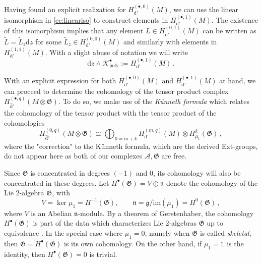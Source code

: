 \documentclass[11pt]{amsart}
\newcommand{\id}{\mathbb{1}}
\newcommand{\dr}{{\mathrm{d}}}
\newcommand{\CA}{{\mathcal A}}
\newcommand{\fG}{\mathfrak{G}}
\numberwithin{equation}{section}
\numberwithin{figure}{section}
\numberwithin{table}{section}
\theoremstyle{thm}
\numberwithin{equation}{subsection}
\theoremstyle{definition}
\theoremstyle{rem}
\begin{document}
Having found an explicit realization for \( H^{(\bullet,0)}_{\mathrm{d}'}(M) \), we can use the linear isomorphism in \eqref{ec:lineariso} to construct elements in \( H^{(\bullet,1)}_{\mathrm{d}'}(M) \). The existence of this isomorphism implies that any element \( \tilde{L} \in H^{(0,1)}_{\mathrm{d}'}(M) \) can be written as \( \tilde{L} = \tilde{L}_z \mathrm{d} z \) for some \( \tilde{L}_z \in H^{(0,0)}_{\mathrm{d}'}(M) \) and similarly with elements in $H^{(1,1)}_{\mathrm{d}'}(M)$. With a slight abuse of notation we will write
\begin{equation}
    \mathrm{d}z\wedge\mathcal{K}_{\mathrm{poly}}^\bullet  := H^{(\bullet,1)}_{\mathrm{d}'}(M) \,.
\end{equation}

With an explicit expression for both \( H^{(\bullet,0)}_{\mathrm{d}'}(M) \) and \( H^{(\bullet,1)}_{\mathrm{d}'}(M) \) at hand, we can proceed to determine the cohomology of the tensor product complex \( H_{\hat{\mathrm{d}}'}^{(\bullet,q)}(M \otimes \mathfrak{G}) \). To do so, we make use of the \emph{Künneth formula} which relates the cohomology of the tensor product with the tensor product of the cohomologies
\begin{equation}
    H_{\hat \dr'}^{(0,q)}(M\otimes \fG)\cong\bigoplus_{0=m+k}H^{(m,q)}_{\dr'}(M)\otimes H^k_{\mu_1}(\fG) \,,
\end{equation}
where the "correction" to the K{\"u}nneth formula, which are the derived Ext-groups, do not appear here as both of our complexes $\CA,\fG$ are free.

Since $\mathfrak{G}$ is concentrated in degrees $(-1)$ and $0$, its cohomology will also be concentrated in these degrees. Let $H^\bullet(\mathfrak{G}) = V \oplus \mathfrak{n}$
denote the cohomology of the Lie 2-algebra $\mathfrak{G}$, with
\begin{equation}
    V = \ker \mu_1 = H^{-1}(\mathfrak{G}), \qquad \mathfrak{n} = \mathfrak{g}/\mathrm{im}(\mu_1)= H^0(\mathfrak{G})\,,
\end{equation}
where $V$ is an Abelian $\mathfrak{n}$-module. By a theorem of Gerstenhaber, the cohomology $H^\bullet(\fG)$ is part of the data which characterizes Lie 2-algebras $\fG$ up to equivalence \cite{Wagemann+2021}. In the special case where $\mu_1=0$, namely when $\fG$ is called \textit{skeletal}, then $\fG = H^\bullet(\fG)$ is its own cohomology. On the other hand, if $\mu_1=\id$ is the identity, then $H^\bullet(\fG)=0$ is trivial. 
\end{document}

